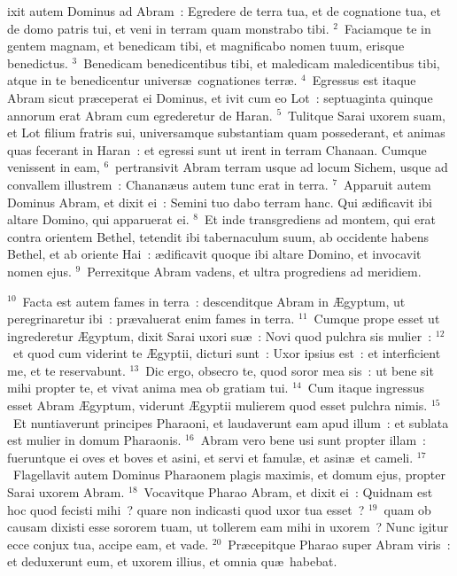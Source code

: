 \bchapter
{}ixit autem Dominus ad Abram~: Egredere de terra tua, et de cognatione tua, et de domo patris tui, et veni in terram quam monstrabo tibi.
${}^{2}$~Faciamque te in gentem magnam, et benedicam tibi, et magnificabo nomen tuum, erisque benedictus.
${}^{3}$~Benedicam benedicentibus tibi, et maledicam maledicentibus tibi, atque in te benedicentur univers\ae\ cognationes terr\ae .
${}^{4}$~Egressus est itaque Abram sicut pr\ae ceperat ei Dominus, et ivit cum eo Lot~: septuaginta quinque annorum erat Abram cum egrederetur de Haran.
${}^{5}$~Tulitque Sarai uxorem suam, et Lot filium fratris sui, universamque substantiam quam possederant, et animas quas fecerant in Haran~: et egressi sunt ut irent in terram Chanaan. Cumque venissent in eam,
${}^{6}$~pertransivit Abram terram usque ad locum Sichem, usque ad convallem illustrem~: Chanan\ae us autem tunc erat in terra.
${}^{7}$~Apparuit autem Dominus Abram, et dixit ei~: Semini tuo dabo terram hanc. Qui \ae dificavit ibi altare Domino, qui apparuerat ei.
${}^{8}$~Et inde transgrediens ad montem, qui erat contra orientem Bethel, tetendit ibi tabernaculum suum, ab occidente habens Bethel, et ab oriente Hai~: \ae dificavit quoque ibi altare Domino, et invocavit nomen ejus.
${}^{9}$~Perrexitque Abram vadens, et ultra progrediens ad meridiem.


${}^{10}$~Facta est autem fames in terra~: descenditque Abram in \AE gyptum, ut peregrinaretur ibi~: pr\ae valuerat enim fames in terra.
${}^{11}$~Cumque prope esset ut ingrederetur \AE gyptum, dixit Sarai uxori su\ae~: Novi quod pulchra sis mulier~:
${}^{12}$~et quod cum viderint te \AE gyptii, dicturi sunt~: Uxor ipsius est~: et interficient me, et te reservabunt.
${}^{13}$~Dic ergo, obsecro te, quod soror mea sis~: ut bene sit mihi propter te, et vivat anima mea ob gratiam tui.
${}^{14}$~Cum itaque ingressus esset Abram \AE gyptum, viderunt \AE gyptii mulierem quod esset pulchra nimis.
${}^{15}$~Et nuntiaverunt principes Pharaoni, et laudaverunt eam apud illum~: et sublata est mulier in domum Pharaonis.
${}^{16}$~Abram vero bene usi sunt propter illam~: fueruntque ei oves et boves et asini, et servi et famul\ae , et asin\ae\ et cameli.
${}^{17}$~Flagellavit autem Dominus Pharaonem plagis maximis, et domum ejus, propter Sarai uxorem Abram.
${}^{18}$~Vocavitque Pharao Abram, et dixit ei~: Quidnam est hoc quod fecisti mihi~? quare non indicasti quod uxor tua esset~?
${}^{19}$~quam ob causam dixisti esse sororem tuam, ut tollerem eam mihi in uxorem~? Nunc igitur ecce conjux tua, accipe eam, et vade.
${}^{20}$~Pr\ae cepitque Pharao super Abram viris~: et deduxerunt eum, et uxorem illius, et omnia qu\ae\ habebat.

